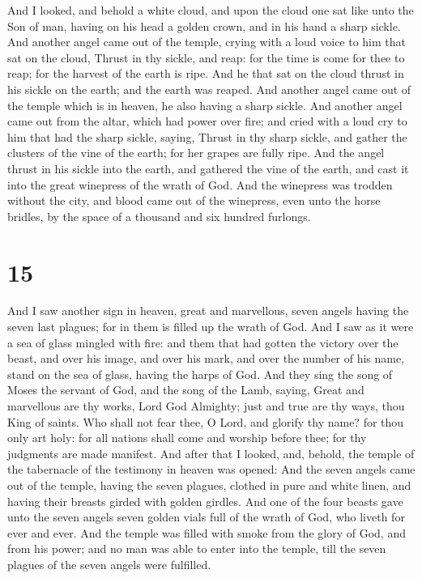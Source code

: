  And I looked, and behold a white cloud, and upon the
cloud one sat like unto the Son of man, having on his head a golden
crown, and in his hand a sharp sickle.  And another angel
came out of the temple, crying with a loud voice to him that sat on the
cloud, Thrust in thy sickle, and reap: for the time is come for thee to
reap; for the harvest of the earth is ripe.  And he that
sat on the cloud thrust in his sickle on the earth; and the earth was
reaped.  And another angel came out of the temple which
is in heaven, he also having a sharp sickle.  And another
angel came out from the altar, which had power over fire; and cried with
a loud cry to him that had the sharp sickle, saying, Thrust in thy sharp
sickle, and gather the clusters of the vine of the earth; for her grapes
are fully ripe.  And the angel thrust in his sickle into
the earth, and gathered the vine of the earth, and cast it into the
great winepress of the wrath of God.  And the winepress
was trodden without the city, and blood came out of the winepress, even
unto the horse bridles, by the space of a thousand and six hundred
furlongs.

\hypertarget{section-14}{%
\section{15}\label{section-14}}

 And I saw another sign in heaven, great and marvellous,
seven angels having the seven last plagues; for in them is filled up the
wrath of God.  And I saw as it were a sea of glass mingled
with fire: and them that had gotten the victory over the beast, and over
his image, and over his mark, and over the number of his name, stand on
the sea of glass, having the harps of God.  And they sing
the song of Moses the servant of God, and the song of the Lamb, saying,
Great and marvellous are thy works, Lord God Almighty; just and true are
thy ways, thou King of saints.  Who shall not fear thee, O
Lord, and glorify thy name? for thou only art holy: for all nations
shall come and worship before thee; for thy judgments are made manifest.
 And after that I looked, and, behold, the temple of the
tabernacle of the testimony in heaven was opened:  And the
seven angels came out of the temple, having the seven plagues, clothed
in pure and white linen, and having their breasts girded with golden
girdles.  And one of the four beasts gave unto the seven
angels seven golden vials full of the wrath of God, who liveth for ever
and ever.  And the temple was filled with smoke from the
glory of God, and from his power; and no man was able to enter into the
temple, till the seven plagues of the seven angels were fulfilled.

